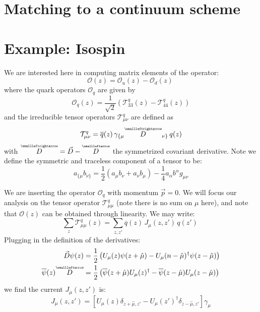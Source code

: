 \documentclass[11pt, oneside]{article}   	%
\theoremstyle{definition}
\newcommand{\cev}[1]{\overset{\scriptscriptstyle\smallleftarrow}{#1}}
\newcommand{\cevvec}[1]{\overset{\scriptscriptstyle\smallleftrightarrow}{#1}}
\begin{document}
\section{Matching to a continuum scheme}

\section{Example: Isospin}

We are interested here in computing matrix elements of the operator:
\begin{equation}
	\mathcal O(z) = \mathcal O_u(z) - \mathcal O_d(z)~
	\label{eq:operator_dfn}
\end{equation}
where the quark operators $\mathcal O_q$ are given by
\begin{equation}
	\mathcal O_q(z) = \frac{1}{\sqrt{2}}(\mathcal T^q_{33}(z) - \mathcal T^q_{44}(z))
\end{equation}
and the irreducible tensor operators $\mathcal T^q_{\mu\nu}$ are defined as
\begin{equation}
	\mathcal T^q_{\mu\nu} = \overline q(z)\, \gamma_{\{\mu} \cevvec{D}_{\nu\}}\, q(z)
\end{equation}
with $\cevvec D = \vec D - \cev D$ the symmetrized covariant derivative. Note we define the symmetric and traceless 
component of a tensor to be:
\begin{equation}
	a_{\{\mu}b_{\nu\}} = \frac{1}{2}(a_\mu b_\nu + a_\nu b_\mu) - \frac{1}{4}a_\alpha b^\alpha g_{\mu\nu}
\end{equation} 

We are inserting the operator $\mathcal O_q$ with momentum $\vec p = 0$. We will focus our analysis on the tensor operator 
$\mathcal T^q_{\mu\mu}$ (note there is no sum on $\mu$ here), and note that $\mathcal O(z)$ can be obtained through 
linearity. We may write:
\begin{equation}
	\sum_z\mathcal T^q_{\mu\mu}(z) = \sum_{z, z'}\overline q(z)\, J_\mu(z, z')\,q(z')~
	\label{eq:operator_mom_proj}
\end{equation}
Plugging in the definition of the derivatives:
\begin{align}
	\vec D\psi(z) &= \frac{1}{2}\left(U_\mu(z)\psi(z + \hat\mu) - U_\mu(n - \hat\mu)^\dagger \psi(z - \hat\mu)\right) \\
	\overline\psi(z) \cev D &= \frac{1}{2}\left(\overline\psi(z + \hat\mu)U_\mu(z)^\dagger - 
	\overline\psi(z - \hat\mu) U_\mu(z - \hat\mu)\right)
\end{align}
we find the current $J_\mu(z, z')$ is:
\begin{equation}
	J_\mu(z, z') = \left[U_\mu(z) \delta_{z + \hat\mu, z'} - U_\mu(z')^\dagger\delta_{z - \hat\mu, z'}\right]\gamma_\mu
\end{equation}
\end{document}
